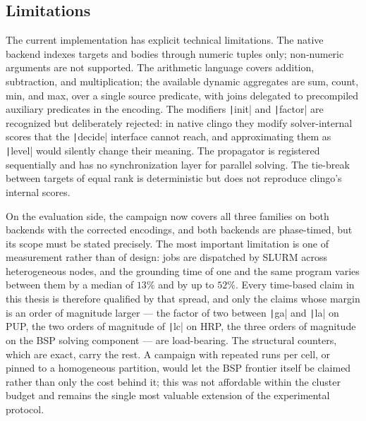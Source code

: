 \subsection{Limitations}

The current implementation has explicit technical limitations. The native backend indexes targets and bodies through numeric tuples only; non-numeric arguments are not supported. The arithmetic language covers addition, subtraction, and multiplication; the available dynamic aggregates are sum, count, min, and max, over a single source predicate, with joins delegated to precompiled auxiliary predicates in the encoding. The modifiers \texttt|init| and \texttt|factor| are recognized but deliberately rejected: in native clingo they modify solver-internal scores that the \texttt|decide| interface cannot reach, and approximating them as \texttt|level| would silently change their meaning. The propagator is registered sequentially and has no synchronization layer for parallel solving. The tie-break between targets of equal rank is deterministic but does not reproduce clingo's internal scores.

On the evaluation side, the campaign now covers all three families on both backends with the corrected encodings, and both backends are phase-timed, but its scope must be stated precisely. The most important limitation is one of measurement rather than of design: jobs are dispatched by SLURM across heterogeneous nodes, and the grounding time of one and the same program varies between them by a median of $13\%$ and by up to $52\%$. Every time-based claim in this thesis is therefore qualified by that spread, and only the claims whose margin is an order of magnitude larger --- the factor of two between \texttt|ga| and \texttt|la| on PUP, the two orders of magnitude of \texttt|lc| on HRP, the three orders of magnitude on the BSP solving component --- are load-bearing. The structural counters, which are exact, carry the rest. A campaign with repeated runs per cell, or pinned to a homogeneous partition, would let the BSP frontier itself be claimed rather than only the cost behind it; this was not affordable within the cluster budget and remains the single most valuable extension of the experimental protocol.

